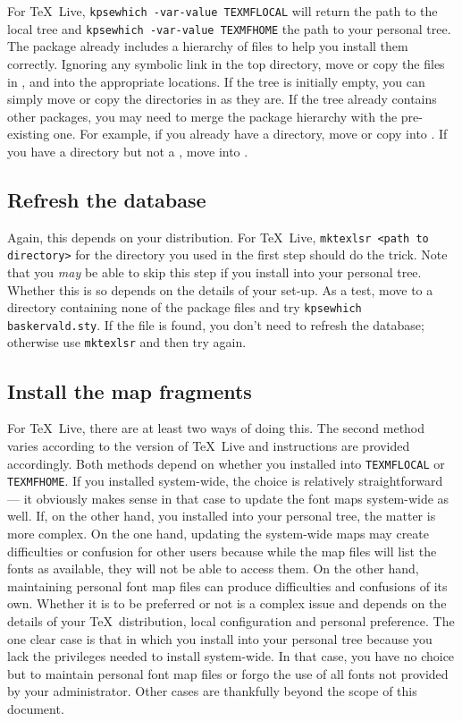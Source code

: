 \documentclass[11pt,british]{article}
\begin{document}
For \TeX~Live, \verb|kpsewhich -var-value TEXMFLOCAL| will return the path to the local tree and \verb|kpsewhich -var-value TEXMFHOME| the path to your personal tree. The package already includes a hierarchy of files to help you install them correctly. Ignoring any symbolic link in the top directory, move or copy the files in ,  and  into the appropriate locations. If the tree is initially empty, you can simply move or copy the directories in as they are. If the tree already contains other packages, you may need to merge the package hierarchy with the pre-existing one. For example, if you already have a  directory, move or copy  into . If you have a  directory but not a , move  into .

\subsection{Refresh the database}

Again, this depends on your distribution. For \TeX~Live, \verb|mktexlsr <path to directory>| for the directory you used in the first step should do the trick. Note that you \emph{may} be able to skip this step if you install into your personal tree. Whether this is so depends on the details of your set-up. As a test, move to a directory containing none of the package files and try \verb|kpsewhich baskervald.sty|. If the file is found, you don't need to refresh the database; otherwise use \verb|mktexlsr| and then try again.

\subsection{Install the map fragments}

For \TeX~Live, there are at least two ways of doing this. The second method varies according to the version of \TeX~Live and instructions are provided accordingly. Both methods depend on whether you installed into \verb|TEXMFLOCAL| or \verb|TEXMFHOME|. If you installed system-wide, the choice is relatively straightforward --- it obviously makes sense in that case to update the font maps system-wide as well. If, on the other hand, you installed into your personal tree, the matter is more complex. On the one hand, updating the system-wide maps may create difficulties or confusion for other users because while the map files will list the fonts as available, they will not be able to access them. On the other hand, maintaining personal font map files can produce difficulties and confusions of its own. Whether it is to be preferred or not is a complex issue and depends on the details of your \TeX\ distribution, local configuration and personal preference. The one clear case is that in which you install into your personal tree because you lack the privileges needed to install system-wide. In that case, you have no choice but to maintain personal font map files or forgo the use of all fonts not provided by your administrator. Other cases are thankfully beyond the scope of this document.
\end{document}
